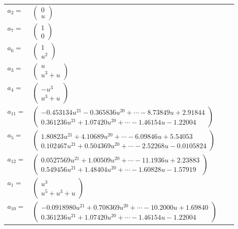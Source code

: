 \documentclass[1p]{elsarticle_modified}
\theoremstyle{definition}
\begin{document}
\begin{tabular}{m{7pt} m{180pt} m{7pt} m{180pt} }
\flushright $a_{2}=$&$\begin{pmatrix}0\\u\end{pmatrix}$ \\
\flushright $a_{7}=$&$\begin{pmatrix}1\\0\end{pmatrix}$ \\
\flushright $a_{6}=$&$\begin{pmatrix}1\\u^2\end{pmatrix}$ \\
\flushright $a_{3}=$&$\begin{pmatrix}u\\u^3+u\end{pmatrix}$ \\
\flushright $a_{4}=$&$\begin{pmatrix}- u^3\\u^3+u\end{pmatrix}$ \\
\flushright $a_{11}=$&$\begin{pmatrix}-0.453134 u^{21}-0.365836 u^{20}+\cdots-8.73849 u+2.91844\\0.361236 u^{21}+1.07420 u^{20}+\cdots-1.46154 u-1.22004\end{pmatrix}$ \\
\flushright $a_{5}=$&$\begin{pmatrix}1.80823 u^{21}+4.10689 u^{20}+\cdots-6.09846 u+5.54053\\0.102467 u^{21}+0.504369 u^{20}+\cdots-2.52268 u-0.0105824\end{pmatrix}$ \\
\flushright $a_{12}=$&$\begin{pmatrix}0.0527569 u^{21}+1.00509 u^{20}+\cdots-11.1936 u+2.23883\\0.549456 u^{21}+1.48404 u^{20}+\cdots-1.60828 u-1.57919\end{pmatrix}$ \\
\flushright $a_{1}=$&$\begin{pmatrix}u^3\\u^5+u^3+u\end{pmatrix}$ \\
\flushright $a_{10}=$&$\begin{pmatrix}-0.0918980 u^{21}+0.708369 u^{20}+\cdots-10.2000 u+1.69840\\0.361236 u^{21}+1.07420 u^{20}+\cdots-1.46154 u-1.22004\end{pmatrix}$ \\

\end{tabular}
\end{document}
